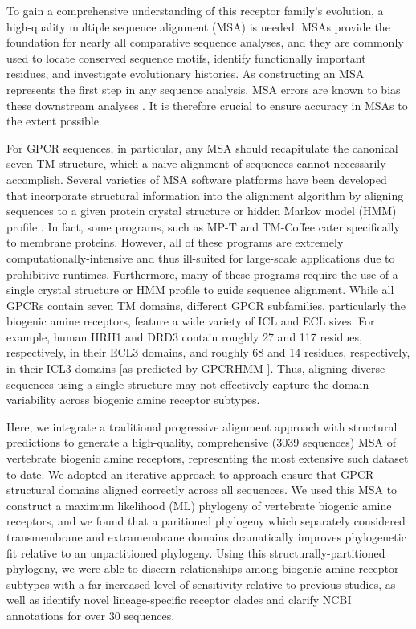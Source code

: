 \documentclass[fleqn,10pt]{wlpeerj}
\begin{document}
To gain a comprehensive understanding of this receptor family's evolution, a high-quality multiple sequence alignment (MSA) is needed. MSAs provide the foundation for nearly all comparative sequence analyses, and they are commonly used to locate conserved sequence motifs, identify functionally important residues, and investigate evolutionary histories. As constructing an MSA represents the first step in any sequence analysis, MSA errors are known to bias these downstream analyses \citep{Ogden2006, Wong2008, Jordan2012}. It is therefore crucial to ensure accuracy in MSAs to the extent possible. 

For GPCR sequences, in particular, any MSA should recapitulate the canonical seven-TM structure, which a naive alignment of sequences cannot necessarily accomplish. Several varieties of MSA software platforms have been developed that incorporate structural information into the alignment algorithm by aligning sequences to a given protein crystal structure \citep{promals3d, 3dcoffee} or hidden Markov model (HMM) profile \citep{hmmer, Chang2012, Hill2012}. In fact, some programs, such as MP-T \citep{Hill2012} and TM-Coffee \citep{Chang2012} cater specifically to membrane proteins. However, all of these programs are extremely computationally-intensive and thus ill-suited for large-scale applications due to prohibitive runtimes. Furthermore, many of these programs require the use of a single crystal structure or HMM profile to guide sequence alignment. While all GPCRs contain seven TM domains, different GPCR subfamilies, particularly the biogenic amine receptors, feature a wide variety of ICL and ECL sizes. For example, human HRH1 and DRD3 contain roughly 27 and 117 residues, respectively, in their ECL3 domains, and roughly 68 and 14 residues, respectively, in their ICL3 domains [as predicted by GPCRHMM \citep{Wistrand2006}]. Thus, aligning diverse sequences using a single structure may not effectively capture the domain variability across biogenic amine receptor subtypes. 

Here, we integrate a traditional progressive alignment approach with structural predictions to generate a high-quality, comprehensive (3039 sequences) MSA of vertebrate biogenic amine receptors, representing the most extensive such dataset to date. We adopted an iterative approach to approach ensure that GPCR structural domains aligned correctly across all sequences. We used this MSA to construct a maximum likelihood (ML) phylogeny of vertebrate biogenic amine receptors, and we found that a paritioned phylogeny which separately considered transmembrane and extramembrane domains dramatically improves phylogenetic fit relative to an unpartitioned phylogeny. Using this structurally-partitioned phylogeny, we were able to discern relationships among biogenic amine receptor subtypes with a far increased level of sensitivity relative to previous studies, as well as identify novel lineage-specific receptor clades and clarify NCBI annotations for over 30 sequences.
\end{document}
